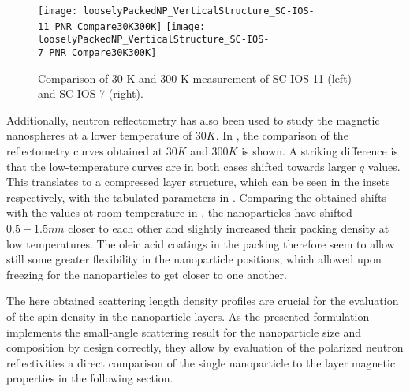 \documentclass[\main/dresen_thesis.tex]{subfiles}
\begin{document}
  \begin{figure}[tb]
    \centering
    \texttt{[image: looselyPackedNP\_VerticalStructure\_SC-IOS-11\_PNR\_Compare30K300K]}
    \texttt{[image: looselyPackedNP\_VerticalStructure\_SC-IOS-7\_PNR\_Compare30K300K]}
    \caption{\label{fig:looselyPackedNP:layer:pnrCompare30K300K}Comparison of 30 K and 300 K measurement of SC-IOS-11 (left) and SC-IOS-7 (right).}
  \end{figure}
  Additionally, neutron reflectometry has also been used to study the magnetic nanospheres at a lower temperature of $30 \unit{K}$.
  In , the comparison of the reflectometry curves obtained at $30 \unit{K}$ and $300 \unit{K}$ is shown.
  A striking difference is that the low-temperature curves are in both cases shifted towards larger $q$ values.
  This translates to a compressed layer structure, which can be seen in the insets respectively, with the tabulated parameters in .
  Comparing the obtained shifts with the values at room temperature in , the nanoparticles have shifted $0.5 - 1.5 \unit{nm}$ closer to each other and slightly increased their packing density at low temperatures.
  The oleic acid coatings in the packing therefore seem to allow still some greater flexibility in the nanoparticle positions, which allowed upon freezing for the nanoparticles to get closer to one another.

  The here obtained scattering length density profiles are crucial for the evaluation of the spin density in the nanoparticle layers.
  As the presented formulation implements the small-angle scattering result for the nanoparticle size and composition by design correctly, they allow by evaluation of the polarized neutron reflectivities a direct comparison of the single nanoparticle to the layer magnetic properties in the following section.
\end{document}
